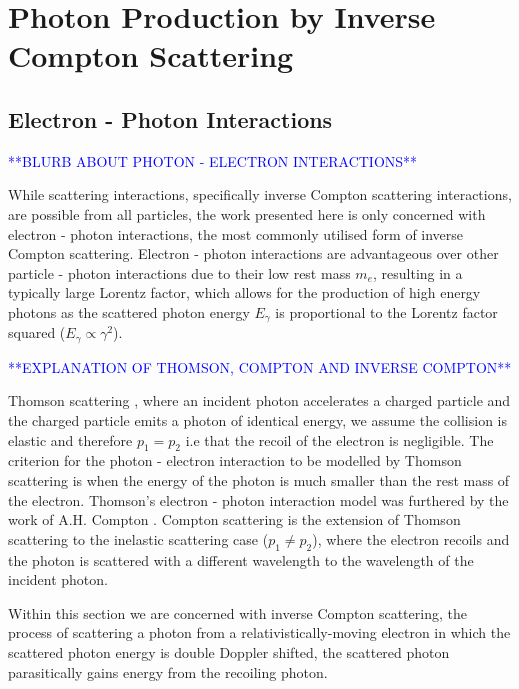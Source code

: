 \documentclass[../main.tex]{subfiles}
\begin{document}
\chapter{Photon Production by Inverse Compton Scattering}
\label{Photon_Production_by_Inverse_Compton_Scattering} %

\section{Electron - Photon Interactions}
\label{sec:electron_photon_interactions}
\textcolor{blue}{**BLURB ABOUT PHOTON - ELECTRON INTERACTIONS**}

While scattering interactions, specifically inverse Compton scattering interactions, are possible from all particles, the work presented here is only concerned with electron - photon interactions, the most commonly utilised form of inverse Compton scattering.  Electron - photon interactions are advantageous over other particle - photon interactions due to their low rest mass $m_{e}$, resulting in a typically large Lorentz factor, which allows for the production of high energy photons as the scattered photon energy $E_{\gamma}$ is proportional to the Lorentz factor squared ($E_{\gamma}\propto\gamma^{2}$).    

\textcolor{blue}{**EXPLANATION OF THOMSON, COMPTON AND INVERSE COMPTON**}

Thomson scattering \cite{thomson1904xxxiv}, where an incident photon accelerates a charged particle and the charged particle emits a photon of identical energy, we assume the collision is elastic and therefore $p_{1} = p_{2}$ i.e that the recoil of the electron is negligible. The criterion for the photon - electron interaction to be modelled by Thomson scattering is when the energy of the photon is much smaller than the rest mass of the electron. Thomson's electron - photon interaction model was furthered by the work of A.H. Compton \cite{compton1923quantum}. Compton scattering is the extension of Thomson scattering to the inelastic scattering case ($p_{1} \neq p_{2}$), where the electron recoils and the photon is scattered with a different wavelength to the wavelength of the incident photon.

Within this section we are concerned with inverse Compton scattering, the process of scattering a photon from a relativistically-moving  electron in which the scattered photon energy is double Doppler shifted, the scattered photon parasitically gains energy from the recoiling photon.  
\end{document}
